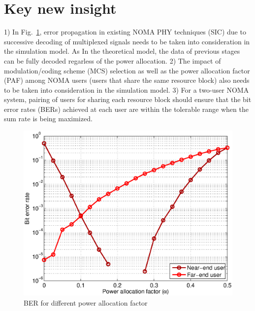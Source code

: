 \section{Key new insight}
\label{sec_key_new_insight}

1) In Fig.~\ref{fig_alphaVSber}, error propagation in existing 
NOMA PHY techniques (SIC) due to successive decoding of multiplexed 
signals needs to be taken into consideration in the simulation model.
As In the theoretical model, the data of previous stages can be 
fully decoded regarless of the power allocation.
2) The impact of modulation/coding scheme (MCS) selection as
well as the power allocation factor (PAF) among NOMA users
(users that share the same resource block) also needs to be taken
into consideration in the simulation model.
3) For a two-user NOMA system, pairing of users for sharing each
resource block should ensure that the bit error rates (BERs)
achieved at each user are within the tolerable range when the sum
rate is being maximized.

\begin{figure}[t]
\begin{center}
\includegraphics[width=0.9\columnwidth ,angle=0]{figure/alphaVSber.eps}
\caption{BER for different power allocation factor}
\label{fig_alphaVSber}
\end{center}
\end{figure}

